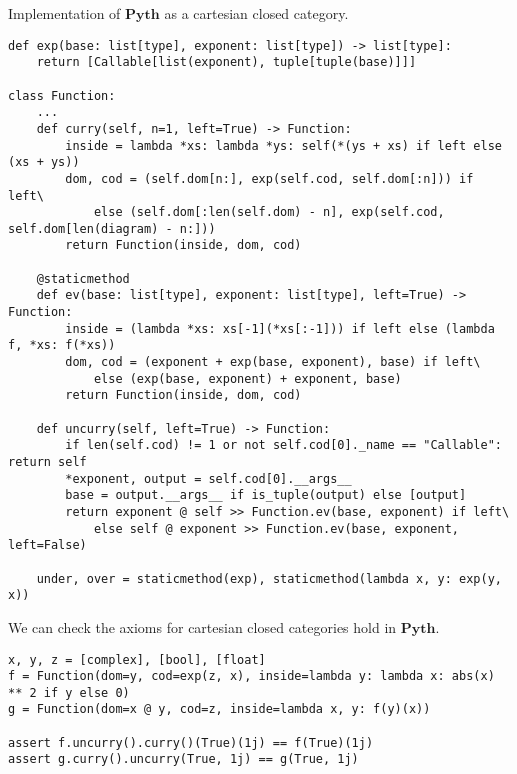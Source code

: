 \begin{python}\label{example:closed-function}
{\normalfont Implementation of $\mathbf{Pyth}$ as a cartesian closed category.}

\begin{verbatim}
def exp(base: list[type], exponent: list[type]) -> list[type]:
    return [Callable[list(exponent), tuple[tuple(base)]]]

class Function:
    ...
    def curry(self, n=1, left=True) -> Function:
        inside = lambda *xs: lambda *ys: self(*(ys + xs) if left else (xs + ys))
        dom, cod = (self.dom[n:], exp(self.cod, self.dom[:n])) if left\
            else (self.dom[:len(self.dom) - n], exp(self.cod, self.dom[len(diagram) - n:]))
        return Function(inside, dom, cod)

    @staticmethod
    def ev(base: list[type], exponent: list[type], left=True) -> Function:
        inside = (lambda *xs: xs[-1](*xs[:-1])) if left else (lambda f, *xs: f(*xs))
        dom, cod = (exponent + exp(base, exponent), base) if left\
            else (exp(base, exponent) + exponent, base)
        return Function(inside, dom, cod)

    def uncurry(self, left=True) -> Function:
        if len(self.cod) != 1 or not self.cod[0]._name == "Callable": return self
        *exponent, output = self.cod[0].__args__
        base = output.__args__ if is_tuple(output) else [output]
        return exponent @ self >> Function.ev(base, exponent) if left\
            else self @ exponent >> Function.ev(base, exponent, left=False)

    under, over = staticmethod(exp), staticmethod(lambda x, y: exp(y, x))
\end{verbatim}
\end{python}

\begin{example}
We can check the axioms for cartesian closed categories hold in $\mathbf{Pyth}$.

\begin{verbatim}
x, y, z = [complex], [bool], [float]
f = Function(dom=y, cod=exp(z, x), inside=lambda y: lambda x: abs(x) ** 2 if y else 0)
g = Function(dom=x @ y, cod=z, inside=lambda x, y: f(y)(x))

assert f.uncurry().curry()(True)(1j) == f(True)(1j)
assert g.curry().uncurry(True, 1j) == g(True, 1j)
\end{verbatim}
\end{example}

